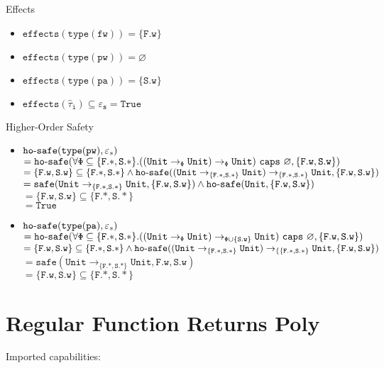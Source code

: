 \documentclass{llncs}
\newcommand{\keywadj}[1]{\mathtt{#1}}
\newcommand{\keyw}[1]{\keywadj{#1}~}
\newcommand{\kw}[1]{\keyw{ #1 }}
\newcommand{\kwa}[1]{\keywadj{ #1 }}
\newcommand{\hyphen}{\hbox{-}}
\newcommand{\Unit}[0]{ \kwa{Unit} }
\newcommand{\safe}[2]{ \kwa{safe}(#1, #2) }
\newcommand{\hosafe}[2]{ \kwa{ho \hyphen safe}(#1, #2) }
\begin{document}
\noindent
Effects
\begin{itemize}
	\item $\kwa{effects(type(fw)) = \{F.w\}}$
	\item $\kwa{effects(type(pw))} = \varnothing$
	\item $\kwa{effects(type(pa)) = \{S.w\}}$
	\item $\kwa{effects(\hat \tau_i) \subseteq \varepsilon_s = True}$
\end{itemize}

\noindent
Higher-Order Safety
\begin{itemize}
	\item $\hosafe{\kwa{type(pw)}}{\varepsilon_s}$\\
		$= \hosafe{\kwa{\forall \Phi \subseteq \{F.*, S.*\}. ((Unit \rightarrow_{\Phi} Unit) \rightarrow_{\Phi} Unit) ~\kw{caps} \varnothing}}{\{\kwa{F.w, S.w}\}}$\\
		$= \{ \kwa{F.w, S.w} \} \subseteq \{ \kwa{F.*, S.*}\} \land \hosafe{(\Unit \rightarrow_{\{ \kwa{F.*, S.*} \}} \Unit) \rightarrow_{\{ \kwa{F.*, S.*} \}} \Unit}{\{ \kwa{F.w, S.w} \}}$\\
		$= \safe{\Unit \rightarrow_{\{ \kwa{F.*, S.*} \}} \Unit}{\{ \kwa{F.w, S.w} \}} \land \hosafe{\Unit}{\{ \kwa{F.w, S.w} \}}$ \\
		$= \{ \kwa{F.w, S.w} \} \subseteq \{ \kwa{F.*, S.*} \}$ \\
		$= \kwa{True}$
		
	\item $\hosafe{\kwa{type(pa)}}{\varepsilon_s}$\\
	$= \hosafe{\kwa{\forall \Phi \subseteq \{F.*, S.*\}. ((Unit \rightarrow_{\Phi} Unit) \rightarrow_{\Phi \cup \kwa{ \{ S.w \} }} Unit) ~\kw{caps} \varnothing}}{\{ \kwa{F.w, S.w}\}}$\\
	$= \{ \kwa{F.w, S.w} \} \subseteq \{ \kwa{F.*, S.*} \} \land \hosafe{ \kwa{ (Unit \rightarrow_{\{F.*, S.*\}} Unit) \rightarrow_{ \{ \{\kwa{F.*, S.*}\} } Unit}}{\{ \kwa{F.w, S.w} \}}$\\
	$= \safe{\kwa{Unit \rightarrow_{\{F.*, S.*\}} Unit}}{\kwa{F.w, S.w}}$ \\
	$= \{ \kwa{F.w, S.w} \} \subseteq \{ \kwa{F.*, S.*} \}$
\end{itemize}

\section{Regular Function Returns Poly}


Imported capabilities:
\end{document}
